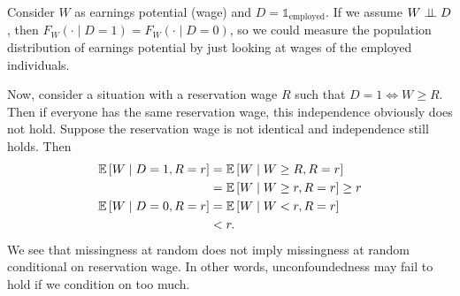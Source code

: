 \begin{example}
	Consider $W$ as earnings potential (wage) and $D = \mathds{1}_{\text{employed}}$. If we assume $W \perp\!\!\!\perp D$, then $F_W(\cdot \mid D=1) = F_W(\cdot \mid D=0)$, so we could measure the population distribution of earnings potential by just looking at wages of the employed individuals.

	Now, consider a situation with a reservation wage $R$ such that $D = 1 \iff W \ge R$. Then if everyone has the same reservation wage, this independence obviously does not hold. Suppose the reservation wage is not identical and independence still holds.
	Then 
	\begin{align*}
		\mathbb{E}\left[W \mid D = 1, R = r\right] &= \mathbb{E}\left[W \mid W \ge R , R= r\right]  \\
											&= \mathbb{E}\left[W \mid W \ge r, R = r\right] \ge r\\
		\mathbb{E}\left[W \mid D=0, R = r\right]  &= \mathbb{E}\left[W \mid W < r, R = r\right] \\
										  &< r
	.\end{align*}
	We see that missingness at random does not imply missingness at random conditional on reservation wage. In other words, unconfoundedness may fail to hold if we condition on too much.
	
\end{example}

